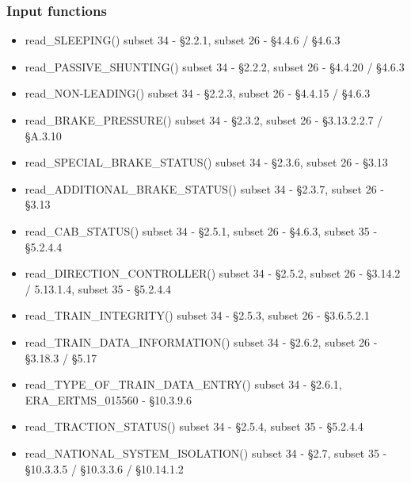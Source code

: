 \documentclass{template/openetcs_article}
\begin{document}
		\subsubsection{Input functions}
		\begin{itemize}
			\item read\_SLEEPING()
				\subitem subset 34 - §2.2.1, subset 26 - §4.4.6 / §4.6.3
			\item read\_PASSIVE\_SHUNTING()
				\subitem subset 34 - §2.2.2, subset 26 - §4.4.20 / §4.6.3
			\item read\_NON-LEADING()
				\subitem subset 34 - §2.2.3, subset 26 - §4.4.15 / §4.6.3
			\item read\_BRAKE\_PRESSURE()
				\subitem subset 34 - §2.3.2, subset 26 - §3.13.2.2.7 / §A.3.10
			\item read\_SPECIAL\_BRAKE\_STATUS()
				\subitem subset 34 - §2.3.6, subset 26 - §3.13
			\item read\_ADDITIONAL\_BRAKE\_STATUS()
				\subitem subset 34 - §2.3.7, subset 26 - §3.13
			\item read\_CAB\_STATUS()
				\subitem subset 34 - §2.5.1, subset 26 - §4.6.3, subset 35 - §5.2.4.4
			\item read\_DIRECTION\_CONTROLLER()
				\subitem subset 34 - §2.5.2, subset 26 - §3.14.2 / 5.13.1.4, subset 35 - §5.2.4.4
			\item read\_TRAIN\_INTEGRITY()
				\subitem subset 34 - §2.5.3, subset 26 - §3.6.5.2.1
			\item read\_TRAIN\_DATA\_INFORMATION()
				\subitem subset 34 - §2.6.2, subset 26 - §3.18.3 / §5.17
			\item read\_TYPE\_OF\_TRAIN\_DATA\_ENTRY()
				\subitem subset 34 - §2.6.1, ERA\_ERTMS\_015560 - §10.3.9.6
			\item read\_TRACTION\_STATUS()
				\subitem subset 34 - §2.5.4, subset 35 - §5.2.4.4
			\item read\_NATIONAL\_SYSTEM\_ISOLATION()
				\subitem subset 34 - §2.7, subset 35 - §10.3.3.5 / §10.3.3.6 / §10.14.1.2
		\end{itemize}
\end{document}
